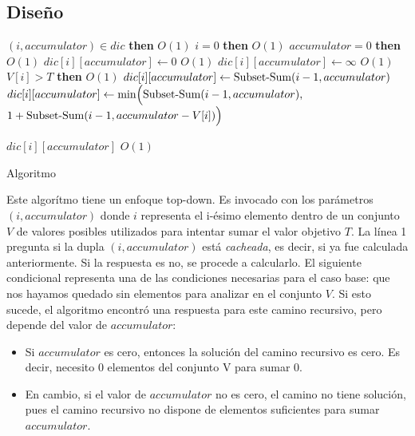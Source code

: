 \subsection{Diseño}
\begin{center}
	\begin{minipage}{.8\textwidth}
		\begin{codebox}
				\li \If $(i, accumulator) \in dic$ \textbf{then}				\RComment $O(1)$
				\li \Then
					\If $i = 0$ \textbf{then}									\RComment $O(1)$
					\li \Then
						\If $accumulator = 0$ \textbf{then}						\RComment $O(1)$
						\li \Then
							 $dic[i][accumulator] \leftarrow 0$ 				\RComment $O(1)$
							  \li
						\Else
							\li $dic[i][accumulator] \leftarrow \infty$ 		\RComment $O(1)$
							\li
						\End
					\Else
						\li \If $V[i] > T$ \textbf{then}						\RComment $O(1)$
						\li \Then
							 $dic[i][accumulator] \leftarrow \func{Subset-Sum}(i - 1, accumulator)$
							 \li
						\Else
							\li $dic[i][accumulator] \leftarrow \func{min}\Big(\func{Subset-Sum}(i - 1, accumulator),$
							\Indentmore \li $1 + \func{Subset-Sum}(i - 1, accumulator - V[i])\Big)$
						\End
					\End
				\End

				\zi
				\li \Return $dic[i][accumulator]$								\RComment $O(1)$
			\End
		\end{codebox}

		\footnotesize Algoritmo
		\label{fig:algoritmo}
	\end{minipage}
\end{center}
Este algorítmo tiene un enfoque top-down. Es invocado con los parámetros $(i, accumulator)$ donde $i$ representa el i-ésimo elemento dentro de un conjunto $V$ de valores posibles utilizados para intentar sumar el valor objetivo $T$. La línea 1 pregunta si la dupla $(i, accumulator)$ está \textit{cacheada}, es decir, si ya fue calculada anteriormente. Si la respuesta es no, se procede a calcularlo. El siguiente condicional representa una de las condiciones necesarias para el caso base: que nos hayamos quedado sin elementos para analizar en el conjunto $V$. Si esto sucede, el algoritmo encontró una respuesta para este camino recursivo, pero depende del valor de $accumulator$:

\begin{itemize}
	\item Si $accumulator$ es cero, entonces la solución del camino recursivo es cero. Es decir, necesito 0 elementos del conjunto V para sumar 0.
	\item En cambio, si el valor de $accumulator$ no es cero, el camino no tiene solución, pues el camino recursivo no dispone de elementos suficientes para sumar $accumulator$.
\end{itemize}

